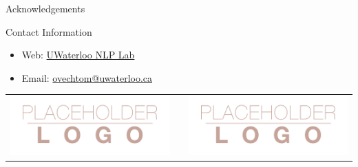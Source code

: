 \documentclass[final]{beamer}
\newlength{\onecolwid}
\begin{document}
\begin{frame}[t]
\begin{columns}[t]
\begin{column}{\onecolwid}
\begin{block}{Acknowledgements}
            \end{block}



            \begin{alertblock}{Contact Information}

                \begin{itemize}
                    \item Web: \href{https://ov-research.uwaterloo.ca/NLP_lab.html}{UWaterloo NLP Lab}
                    \item Email: \href{mailto:ovechtom@uwaterloo.ca}{ovechtom@uwaterloo.ca}
                \end{itemize}

            \end{alertblock}

            \begin{center}
                \begin{tabular}{ccc}
                    \includegraphics[width=0.4\linewidth]{logo.png} & \hfill & \includegraphics[width=0.4\linewidth]{logo.png}
                \end{tabular}
            \end{center}


        \end{column} %

    \end{columns} %

\end{frame} %
\end{document}
